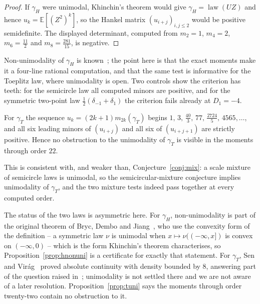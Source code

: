 \begin{proof}
If $\gamma_H$ were unimodal, Khinchin's theorem would give
$\gamma_H=\operatorname{law}(UZ)$ and hence $u_k=\mathbb E[(Z^2)^k]$, so
the Hankel matrix $(u_{i+j})_{i,j\le2}$ would be positive semidefinite.
The displayed determinant, computed from $m_2=1$, $m_4=2$, $m_6=\tfrac{11}2$
and $m_8=\tfrac{281}{15}$, is negative.
\end{proof}

Non-unimodality of $\gamma_H$ is known~\cite[Prop.~A.2]{BDJ}; the point
here is that the exact moments make it a four-line rational computation,
and that the same test is informative for the Toeplitz law, where
unimodality is open.  Two controls show the criterion has teeth: for the
semicircle law all computed minors are positive, and for the symmetric
two-point law $\tfrac12(\delta_{-1}+\delta_1)$ the criterion fails
already at $D_1=-4$.

\begin{proposition}
\label{prop:tuni}
For $\gamma_T$ the sequence $u_k=(2k+1)m_{2k}(\gamma_T)$ begins
$1,\,3,\,\tfrac{40}3,\,77,\,\tfrac{2724}5,\,4565,\dots$, and all six
leading minors of $(u_{i+j})$ and all six of $(u_{i+j+1})$ are strictly
positive.  Hence no obstruction to the unimodality of $\gamma_T$ is
visible in the moments through order $22$.
\end{proposition}

This is consistent with, and weaker than,
Conjecture~\ref{conj:mix}: a scale mixture of semicircle laws is
unimodal, so the semicircular-mixture conjecture implies unimodality of
$\gamma_T$, and the two mixture tests indeed pass together at every
computed order.

The status of the two laws is asymmetric here.  For $\gamma_H$,
non-unimodality is part of the original theorem of Bryc, Dembo and
Jiang~\cite{BDJ}, who use the convexity form of the definition -- a
symmetric law $\nu$ is unimodal when $x\mapsto\nu((-\infty,x])$ is
convex on $(-\infty,0)$ -- which is the form Khinchin's theorem
characterises, so
Proposition~\ref{prop:hnonuni} is a certificate for exactly that
statement.  For $\gamma_T$, Sen and Vir\'ag~\cite{SenVirag} proved
absolute continuity with density bounded by $8$, answering part of the
question raised in~\cite{BDJ}; unimodality is not settled there and we
are not aware of a later resolution.  Proposition~\ref{prop:tuni} says
the moments through order twenty-two contain no obstruction to it.

